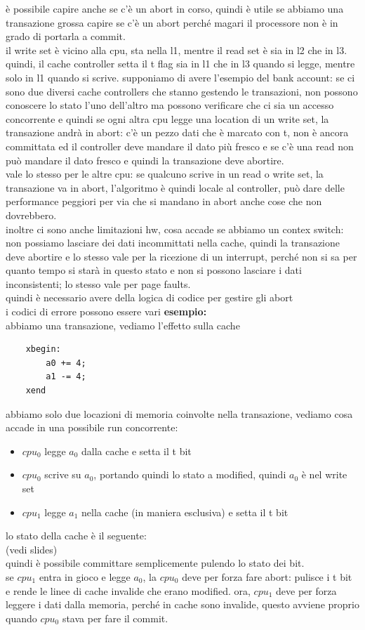 \documentclass[12pt, oneside]{extbook} %
\begin{document}
è possibile capire anche se c'è un abort in corso, quindi è utile se abbiamo una transazione grossa capire se c'è un abort perché magari il processore non è in grado di portarla a commit.\\ il write set è vicino alla cpu, sta nella l1, mentre il read set è sia in l2 che in l3. quindi, il cache controller setta il t flag sia in l1 che in l3 quando si legge, mentre solo in l1 quando si scrive. supponiamo di avere l'esempio del bank account: se ci sono due diversi cache controllers che stanno gestendo le transazioni, non possono conoscere lo stato l'uno dell'altro ma possono verificare che ci sia un accesso concorrente e quindi se ogni altra cpu legge una location di un write set, la transazione andrà in abort: c'è un pezzo dati che è marcato con t, non è ancora committata ed il controller deve mandare il dato più fresco e se c'è una read non può mandare il dato fresco e quindi la transazione deve abortire.\\ vale lo stesso per le altre cpu: se qualcuno scrive in un read o write set, la transazione va in abort, l'algoritmo è quindi locale al controller, può dare delle performance peggiori per via che si mandano in abort anche cose che non dovrebbero. \\inoltre ci sono anche limitazioni hw, cosa accade se abbiamo un contex switch: non possiamo lasciare dei dati incommittati nella cache, quindi la transazione deve abortire e lo stesso vale per la ricezione di un interrupt, perché non si sa per quanto tempo si starà in questo stato e non si possono lasciare i dati inconsistenti; lo stesso vale per page faults.\\ quindi è necessario avere della logica di codice per gestire gli abort\\ i codici di errore possono essere vari
\textbf{esempio:}\\ abbiamo una transazione, vediamo l'effetto sulla cache
\begin{lstlisting}
	xbegin:
		a0 += 4;
		a1 -= 4;
	xend
\end{lstlisting}
abbiamo solo due locazioni di memoria coinvolte nella transazione, vediamo cosa accade in una possibile run concorrente:
\begin{itemize}
\item $cpu_0$ legge $a_0$ dalla cache e setta il t bit
\item $cpu_0$ scrive su $a_0$, portando quindi lo stato a modified, quindi $a_0$ è nel write set
\item $cpu_1$ legge $a_1$ nella cache (in maniera esclusiva) e setta il t bit
\end{itemize}
lo stato della cache è il seguente:\\
(vedi slides)\\
quindi è possibile committare semplicemente pulendo lo stato dei bit.\\ se $cpu_1$ entra in gioco e legge $a_0$, la $cpu_0$ deve per forza fare abort: pulisce i t bit e rende le linee di cache invalide che erano modified. ora, $cpu_1$ deve per forza leggere i dati dalla memoria, perché in cache sono invalide, questo avviene proprio quando $cpu_0$ stava per fare il commit.
\end{document}

